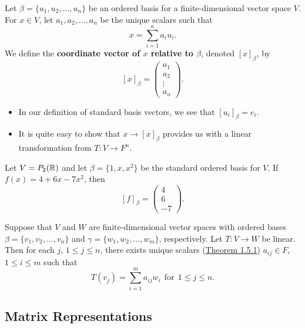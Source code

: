 \begin{definition}
    Let \( \beta = \{ u_{1}, u_{2}, \dots, u_{n} \}  \) be an ordered basis for a finite-dimensional vector space \( V  \). For \( x \in V  \), let \( a_{1}, a_{2}, \dots, a_{n} \) be the unique scalars such that 
    \[  x = \sum_{ i=1 }^{ n } a_{i} u_{i}. \]
    We define the \textbf{coordinate vector of \( x \) relative to \( \beta \)}, denoted \( [x]_{\beta} \), by
    \[ [x]_{\beta} = \begin{pmatrix}
        a_{1} \\
        a_{2} \\
        \vdots \\
        a_{n}
    \end{pmatrix}. \]
\end{definition}
\begin{itemize}
    \item In our definition of standard basis vectors, we see that \( [u_{i}]_{\beta} = e_{i}  \).
    \item It is quite easy to show that \( x \to [x]_{\beta} \) provides us with a linear transformation from \( T: V \to F^{n} \).
\end{itemize}

\begin{eg}
    Let \( V = {P}_{2}(\mathbb{R}) \) and let \( \beta  = \{ 1 , x , x^{2} \}  \) be the standard ordered basis for \( V  \). If \( f(x) = 4 + 6x - 7 x^{2} \), then 
    \[  {[f]}_{\beta} = \begin{pmatrix}
        4 \\
        6 \\
        -7
    \end{pmatrix}. \]
\end{eg}
    
Suppose that \( V  \) and \( W  \) are finite-dimensional vector spaces with ordered bases 
    \( \beta = \{  {v}_{1}, {v}_{2}, \dots , {v}_{n} \}  \) and \( \gamma = \{ {w}_{1}, {w}_{2}, \dots, {w}_{m} \} \), respectively. Let \( T : V \to W  \) be linear. Then for each \( j  \), \( 1 \leq j \leq n  \), there exists unique scalars ({\hyperref[Unique combinations from bases]{Theorem 1.5.1}}) \( {a}_{ij} \in F  \), \( 1 \leq i \leq m  \) such that
    \[  T({v}_{j}) = \sum_{ i=1 }^{ m } {a}_{ij} {w}_{i} \ \ \text{for} \ \ 1 \leq j \leq n. \]

\subsection{Matrix Representations}


